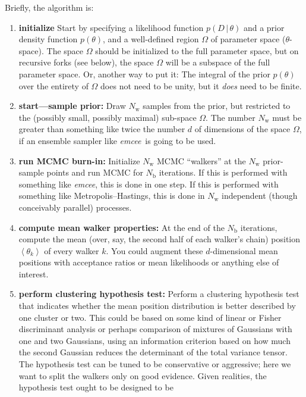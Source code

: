 \documentclass[12pt]{article}
\newcommand{\project}[1]{\textsl{#1}}
\newcommand{\emcee}{\project{emcee}}
\newcommand{\mean}[1]{\left<{#1}\right>}
\newcommand{\given}{\,|\,}
\newcommand{\data}{D}
\newcommand{\pars}{\theta}
\newcommand{\parspace}{\Omega}
\newcommand{\nwalker}{N_{\mathrm{w}}}
\newcommand{\ndim}{d}
\newcommand{\nburn}{N_{\mathrm{b}}}
\begin{document}
Briefly, the algorithm is:
\begin{enumerate}
\item \textbf{initialize} Start by specifying a likelihood function
  $p(\data\given\pars)$ and a prior density function $p(\pars)$, and a
  well-defined region $\parspace$ of parameter space ($\pars$-space).
  The space $\parspace$ should be initialized to the full parameter
  space, but on recursive forks (see below), the space $\parspace$
  will be a subspace of the full parameter space.  Or, another way to
  put it: The integral of the prior $p(\pars)$ over the entirety of
  $\parspace$ does not need to be unity, but it \emph{does} need to be
  finite.
\item \label{step:start}\textbf{start---sample prior:} Draw $\nwalker$
  samples from the prior, but restricted to the (possibly small,
  possibly maximal) sub-space $\parspace$.  The number $\nwalker$ must
  be greater than something like twice the number $\ndim$ of
  dimensions of the space $\parspace$, if an ensemble sampler like
  \emcee\ is going to be used.
\item \textbf{run MCMC burn-in:} Initialize $\nwalker$ MCMC ``walkers''
  at the $\nwalker$ prior-sample points and run MCMC for $\nburn$
  iterations.  If this is performed with something like \emcee, this
  is done in one step.  If this is performed with something like
  Metropolis--Hastings, this is done in $\nwalker$ independent (though
  conceivably parallel) processes.
\item \textbf{compute mean walker properties:} At the end of the
  $\nburn$ iterations, compute the mean (over, say, the second half of
  each walker's chain) position $\mean{\pars_k}$ of every walker $k$.
  You could augment these $\ndim$-dimensional mean positions with
  acceptance ratios or mean likelihoods or anything else of interest.
\item \textbf{perform clustering hypothesis test:} Perform a
  clustering hypothesis test that indicates whether the mean position
  distribution is better described by one cluster or two.  This could
  be based on some kind of linear or Fisher discriminant analysis or
  perhaps comparison of mixtures of Gaussians with one and two
  Gaussians, using an information criterion based on how much the
  second Gaussian reduces the determinant of the total variance
  tensor.  The hypothesis test can be tuned to be conservative or
  aggressive; here we want to split the walkers only on good evidence.
  Given realities, the hypothesis test ought to be designed to be

\end{enumerate}
\end{document}
